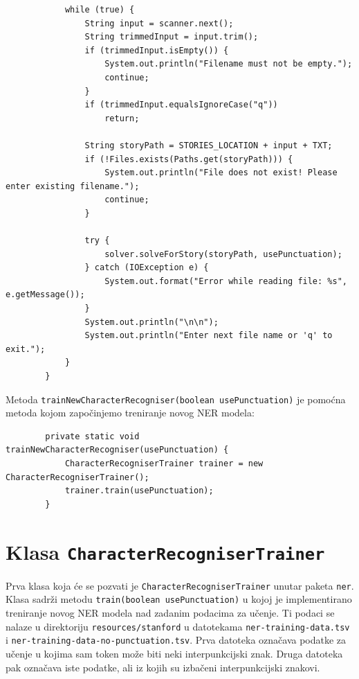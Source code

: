 \documentclass[a4paper,twoside,12pt]{memoir} %
\begin{document}
\begin{lstlisting}
			while (true) {
				String input = scanner.next();
				String trimmedInput = input.trim();
				if (trimmedInput.isEmpty()) {
					System.out.println("Filename must not be empty.");
					continue;
				}
				if (trimmedInput.equalsIgnoreCase("q"))
					return;

				String storyPath = STORIES_LOCATION + input + TXT;
				if (!Files.exists(Paths.get(storyPath))) {
					System.out.println("File does not exist! Please enter existing filename.");
					continue;
				}

				try {
					solver.solveForStory(storyPath, usePunctuation);
				} catch (IOException e) {
					System.out.format("Error while reading file: %s", e.getMessage());
				}
				System.out.println("\n\n");
				System.out.println("Enter next file name or 'q' to exit.");
			}
		}
		\end{lstlisting}

		Metoda \;\texttt{trainNewCharacterRecogniser(boolean usePunctuation)}\; je po\-moć\-na metoda kojom započinjemo treniranje novog NER modela:

		\begin{lstlisting}
		private static void trainNewCharacterRecogniser(usePunctuation) {
			CharacterRecogniserTrainer trainer = new CharacterRecogniserTrainer();
			trainer.train(usePunctuation);
		}
		\end{lstlisting}

		\newpage

	\section{Klasa \texttt{CharacterRecogniserTrainer}}

		Prva klasa koja će se pozvati je \texttt{CharacterRecogniserTrainer} unutar paketa \texttt{ner}. Klasa sadrži metodu \texttt{train(boolean usePunctuation)} u kojoj je implementirano treniranje novog NER modela nad zadanim podacima za učenje. Ti podaci se nalaze u direktoriju \texttt{resources/stanford} u datotekama \texttt{ner-training-data.tsv} i \texttt{ner-training-data-no-punctuation.tsv}. Prva datoteka označava podatke za učenje u kojima sam token može biti neki interpunkcijski znak. Druga datoteka pak označava iste podatke, ali iz kojih su izbačeni interpunkcijski znakovi.
\end{document}
